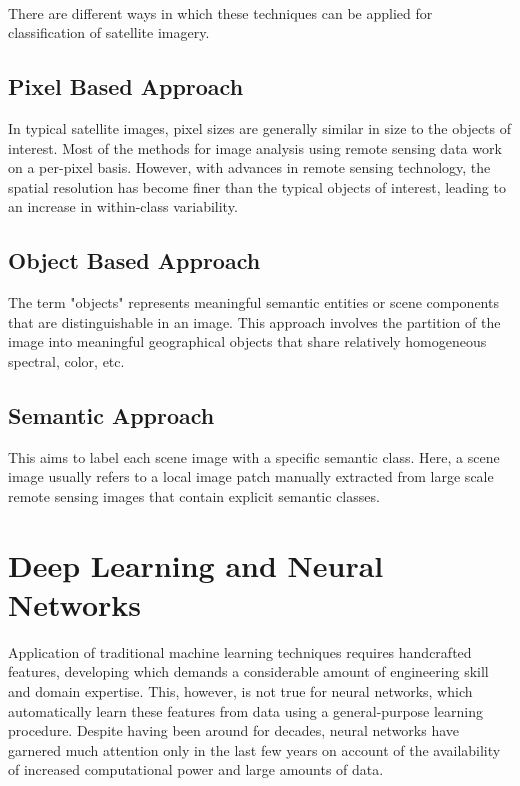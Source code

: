\documentclass[12pt, a4paper]{report}
\begin{document}
\paragraph{}
There are different ways in which these techniques can be applied for classification of satellite imagery.
\subsection{Pixel Based Approach}
In typical satellite images, pixel sizes are generally similar in size to the objects of interest. Most of the methods for image analysis using remote sensing data work on a per-pixel basis. However, with advances in remote sensing technology, the spatial resolution has become finer than the typical objects of interest, leading to an increase in within-class variability.\cite{eyesky}
\subsection{Object Based Approach}
The term "objects" represents meaningful semantic entities or scene components that are distinguishable in an image.\cite{eyesky} This approach involves the partition of the image into meaningful geographical objects that share relatively homogeneous spectral, color, etc.
\subsection{Semantic Approach}
This aims to label each scene image with a specific semantic class. Here, a scene image usually refers to a local image patch manually extracted from large scale remote sensing images that contain explicit semantic classes.\cite{eyesky}

\section{Deep Learning and Neural Networks}
Application of traditional machine learning techniques requires handcrafted features, developing which demands a considerable amount of engineering skill and domain expertise. This, however, is not true for neural networks, which automatically learn these features from data using a general-purpose learning procedure.\cite{eyesky, cs231n} Despite having been around for decades, neural networks have garnered much attention only in the last few years on account of the availability of increased computational power and large amounts of data.
\end{document}

